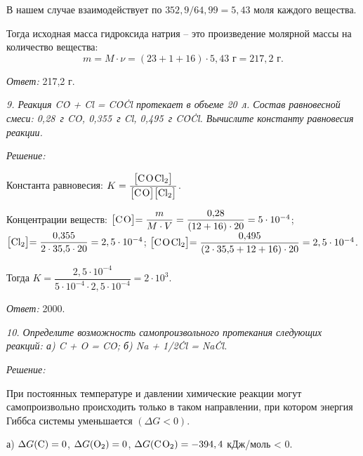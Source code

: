 В нашем случае взаимодействует по \( 352,\!9/64,\!99 = 5,\!43 \) моля каждого
вещества.

Тогда исходная масса гидроксида натрия -- это произведение молярной массы на
количество вещества:
\[
    m = M \cdot \nu = (23 + 1 + 16) \cdot 5,\!43 \text{ г} = 217,\!2 \text{ г}.
\]

\vspace*{2em}
\emph{Ответ:} 217,2 г.

\newpage %

\emph{9. Реакция C\.O + Cl =
C\.O\.Cl протекает в объеме 20~л. Состав равновесной смеси:
0,28~г C\.O, 0,355~г Cl, 0,495~г C\.O\.Cl. Вычислите константу
равновесия реакции.}

\vspace*{2em}
\emph{Решение:}

Константа равновесия: \( K = \dfrac{\bigr[\mathrm{C\;\!O\;\!Cl_2}\bigl]}{\bigr[\mathrm{C\;\!O}\bigl]
\bigr[\mathrm{Cl_2}\bigl]} \).

Концентрации веществ:
\( \bigr[\mathrm{C\;\!O}\bigl] = \dfrac{m}{M\cdot V} = \dfrac{0,\!28}{(12 + 16)\cdot 20} =
5\cdot 10^{-4} \);\\
\( \bigr[\mathrm{Cl_2}\bigl] = \dfrac{0,\!355}{2\cdot 35,\!5 \cdot 20} = 2,5\cdot
10^{-4} \);
\( \bigr[\mathrm{C\;\!O\;\!Cl_2}\bigl] = \dfrac{0,\!495}{(2\cdot 35,\!5 + 12 + 16) \cdot 20}
= 2,5\cdot 10^{-4} \).

Тогда \( K = \dfrac{2,5\cdot 10^{-4}}{5\cdot 10^{-4}\cdot 2,5\cdot 10^{-4}} =
2 \cdot 10^3 \).

\vspace*{2em}
\emph{Ответ:} 2000.

\newpage %

\emph{10. Определите возможность самопроизвольного протекания следующих
реакций: а) C + O = C\.O; \qquad
б) Na + 1\!/2\.Cl = Na\.Cl.}

\vspace*{2em}
\emph{Решение:}

При постоянных температуре и давлении химические реакции могут самопроизвольно
происходить только в таком направлении, при котором энергия Гиббса системы
уменьшается \( (\Delta G < 0) \).

а) \( \Delta G(\mathrm{C}) = 0 \), \( \Delta G(\mathrm{O_2}) = 0 \),
\( \Delta G(\mathrm{C\;\!O_2}) = -394,4 \) кДж/моль < 0.


